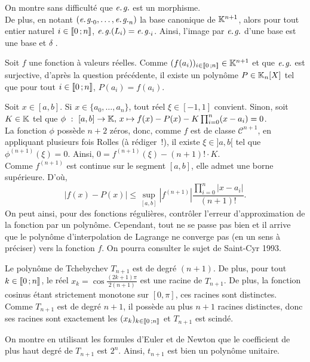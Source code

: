 \begin{solution}
\begin{questions}
\item On montre sans difficulté que $\textit{e.\nobreak\hspace{1pt}{}g.}$ est un morphisme. \\
De plus, en notant $(\textit{e.\nobreak\hspace{1pt}{}g.}_0,\ldots,\textit{e.\nobreak\hspace{1pt}{}g.}_n)$ la base canonique de $\mathbb{K}^{n+1}$, alors pour tout entier naturel $i \in \llbracket 0\,; n \rrbracket$, $\textit{e.\nobreak\hspace{1pt}{}g.}(L_i) = \textit{e.\nobreak\hspace{1pt}{}g.}_i$. Ainsi, l'image par $\textit{e.\nobreak\hspace{1pt}{}g.}$ d'une base est une base et
{
$\delta$ .
}

\item Soit $f$ une fonction à valeurs réelles. Comme $(f(a_i))_{i\in\llbracket 0\,; n \rrbracket} \in \mathbb{K}^{n+1}$ et que $\textit{e.\nobreak\hspace{1pt}{}g.}$ est surjective, d'après la question précédente, il existe un polynôme $P \in \mathbb{K}_n[X]$ tel que pour tout $i \in \llbracket 0\,; n \rrbracket$, $P(a_i) = f(a_i)$.

\item Soit $x \in [a,b]$. Si $x \in \{a_0,\ldots,a_n\}$, tout réel $\xi \in [-1, 1]$ convient. Sinon, soit $K \in \mathbb{K}$ tel que $\phi~:~[a,b] \to \mathbb{K},\, x \mapsto f(x) - P(x) - K \prod_{i=0}^n (x - a_i) = 0$.\\
La fonction $\phi$ possède $n+2$ zéros, donc, comme $f$ est de classe $\mathscr{C}^{n+1}$, en appliquant plusieurs fois Rolles (à rédiger~!), il existe $\xi \in ]a,b[$ tel que $\phi^{(n+1)}(\xi) = 0$. Ainsi, $0 = f^{(n+1)}(\xi) - (n+1)! \cdot K$.\\
Comme $f^{(n+1)}$ est continue sur le segment $[a,b]$, elle admet une borne supérieure. D'où,
\[
|f(x) - P(x)| \leq \sup_{[a,b]} |f^{(n+1)}| \frac{\prod_{i=0}^n |x-a_i|}{(n+1)!}.
\]
{
On peut ainsi, pour des fonctions régulières, contrôler l'erreur d'approximation de la fonction par un polynôme. Cependant, tout ne se passe pas bien et il arrive que le polynôme d'interpolation de Lagrange { ne converge pas} (en un sens à préciser) vers la fonction $f$. On pourra consulter le sujet de Saint-Cyr 1993.
}

\item Le polynôme de Tchebychev $T_{n+1}$ est de degré $(n+1)$. De plus, pour tout $k \in \llbracket 0\,; n \rrbracket$, le réel $x_k = \cos \frac{(2k+1)\pi}{2(n+1)}$ est une racine de $T_{n+1}$. De plus, la fonction cosinus étant strictement monotone sur $[0,\pi]$, ces racines sont distinctes. Comme $T_{n+1}$ est de degré $n+1$, il possède au plus $n+1$ racines distinctes, donc ses racines sont exactement les $(x_k)_{k\in\llbracket 0\,; n \rrbracket}$ et $T_{n+1}$ est scindé.

\item On montre en utilisant les formules d'Euler et de Newton que le coefficient de plus haut degré de $T_{n+1}$ est $2^n$. Ainsi, $t_{n+1}$ est bien un polynôme unitaire.


\end{questions}
\end{solution}
